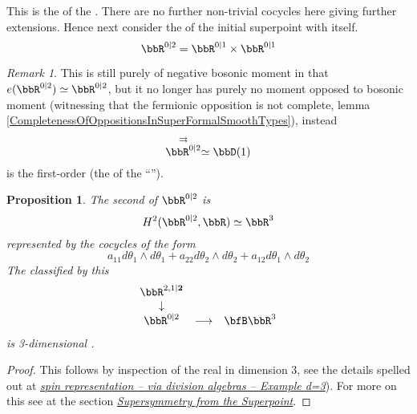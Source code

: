 \documentclass[12pt,titlepage]{article}
\newcommand{\itexarray}[1]{\begin{matrix}#1\end{matrix}}
\theoremstyle{plain}
\newtheorem{prop}{Proposition}
\theoremstyle{definition}
\theoremstyle{remark}
\newtheorem{remark}{Remark}
\begin{document}
This is the  of the .
There are no further non-trivial cocycles here giving further extensions.
Hence next consider the  of the initial superpoint with itself.
\begin{displaymath}
\bbR^{0|2}
=
\bbR^{0|1}\times \bbR^{0|1}
\end{displaymath}
\begin{remark}
\label{}\hypertarget{}{}
This is still purely of negative bosonic moment in that $e(\bbR^{0|2}) \simeq \bbR^{0|2}$, but it no longer has purely no moment opposed to bosonic moment (witnessing that the fermionic opposition is not complete, lemma \ref{CompletenessOfOppositionsInSuperFormalSmoothTypes}), instead
\begin{displaymath}
\stackrel{\rightrightarrows}{\bbR^{0|2}}
\simeq
\bbD(1)
\end{displaymath}
is the first-order  (the  of the ``'').
\end{remark}
\begin{prop}
\label{3dSuperMinkowskiSpacetime}\hypertarget{3dSuperMinkowskiSpacetime}{}
The second   of $\bbR^{0\vert 2}$ is
\begin{displaymath}
H^2(\bbR^{0\vert 2}, \bbR)
\simeq
\bbR^3
\end{displaymath}
represented by the cocycles of the form
\begin{displaymath}
a_{11}

d\theta_1 \wedge d\theta_1
+
a_{22}

d\theta_2 \wedge d\theta_2
+
a_{12}

d\theta_1 \wedge d\theta_2
\end{displaymath}
The  classified by this
\begin{displaymath}
\itexarray{
\bbR^{2,1|\mathbf{2}}
\\
\downarrow
\\
\bbR^{0|2}
&\stackrel{}{\longrightarrow}&
\bfB \bbR^3
}
\end{displaymath}
is 3-dimensional .
\end{prop}
\begin{proof}
This follows by inspection of the real  in dimension 3, see the details spelled out at \emph{\href{http://ncatlab.org/nlab/show/spin%20representation#RealSpinorRepsIn3d}{spin representation -- via division algebras -- Example d=3}}).
For more on this see at  the section \emph{\href{https://ncatlab.org/nlab/show/geometry+of+physics+--+supersymmetry#SupersymmetryFromTheSuperpoint}{Supersymmetry from the Superpoint}}.
\end{proof}
\end{document}
